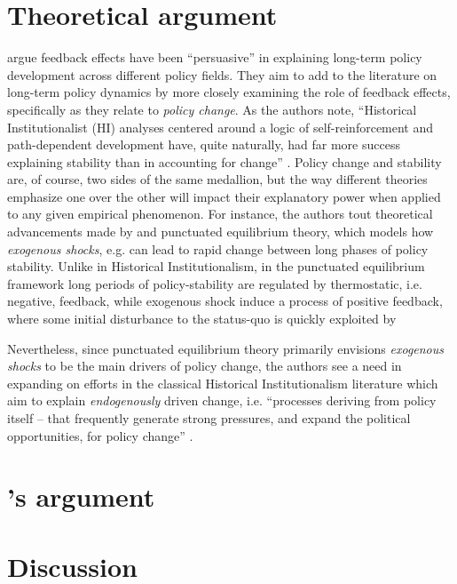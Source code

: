 \documentclass[11pt, xcolor=dvipsnames]{article}
\begin{document}
\section*{Theoretical argument}
\textcite[][]{Jacobs2014} argue feedback effects have been \enquote{persuasive}  in explaining long-term policy development across different policy fields. They aim to add to the literature on long-term policy dynamics by more closely examining the role of feedback effects, specifically as they relate to \textit{policy change}. As the authors note, \enquote{Historical Institutionalist (HI) analyses centered around a logic of self-reinforcement and path-dependent development have, quite naturally, had far more success explaining stability than in accounting for change} \parencite[][p. 443]{Jacobs2014}. Policy change and stability are, of course, two sides of the same medallion, but the way different theories emphasize one over the other will impact their explanatory power when applied to any given empirical phenomenon. For instance, the authors tout theoretical advancements made by \textcite[][]{Baumgartner2002} and punctuated equilibrium theory, which models how \textit{exogenous shocks}, e.g. can lead to rapid change between long phases of policy stability. Unlike in Historical Institutionalism, in the punctuated equilibrium framework long periods of policy-stability are regulated by thermostatic, i.e. negative, feedback, while exogenous shock induce a process of positive feedback, where some initial disturbance to the status-quo is quickly exploited by 

Nevertheless, since punctuated equilibrium theory primarily envisions \textit{exogenous shocks} to be the main drivers of policy change, the authors see a need in expanding on efforts in the classical Historical Institutionalism literature which aim to explain \textit{endogenously} driven change, i.e. \enquote{processes deriving from policy itself -- that frequently generate strong pressures, and expand the political opportunities, for policy change} \parencite[p. 442]{Jacobs2014}. 


\section*{\citeauthor[][]{Jacobs2014}'s \citeyear{Jacobs2014} argument}


\section*{Discussion}


\newpage
\newpage
\thispagestyle{empty}
\begingroup
{}
\printbibliography
\endgroup
\end{document}
